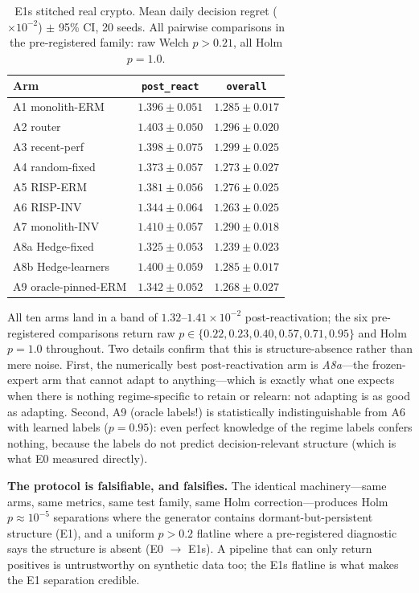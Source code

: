 \begin{table}[h]
\centering
\caption{E1s stitched real crypto. Mean daily decision regret
($\times 10^{-2}$) $\pm$ 95\% CI, 20 seeds. All pairwise comparisons in the
pre-registered family: raw Welch $p > 0.21$, all Holm $p = 1.0$.}
\label{tab:dd5-e1s}
\small
\begin{tabular}{lcc}
\toprule
Arm & \texttt{post\_react} & \texttt{overall} \\
\midrule
A1 monolith-ERM      & $1.396 \pm 0.051$ & $1.285 \pm 0.017$ \\
A2 router            & $1.403 \pm 0.050$ & $1.296 \pm 0.020$ \\
A3 recent-perf       & $1.398 \pm 0.075$ & $1.299 \pm 0.025$ \\
A4 random-fixed      & $1.373 \pm 0.057$ & $1.273 \pm 0.027$ \\
A5 RISP-ERM      & $1.381 \pm 0.056$ & $1.276 \pm 0.025$ \\
A6 RISP-INV      & $1.344 \pm 0.064$ & $1.263 \pm 0.025$ \\
A7 monolith-INV      & $1.410 \pm 0.057$ & $1.290 \pm 0.018$ \\
A8a Hedge-fixed      & $1.325 \pm 0.053$ & $1.239 \pm 0.023$ \\
A8b Hedge-learners   & $1.400 \pm 0.059$ & $1.285 \pm 0.017$ \\
A9 oracle-pinned-ERM & $1.342 \pm 0.052$ & $1.268 \pm 0.027$ \\
\bottomrule
\end{tabular}
\end{table}

All ten arms land in a band of $1.32$--$1.41 \times 10^{-2}$
post-reactivation; the six pre-registered comparisons return raw
$p \in \{0.22, 0.23, 0.40, 0.57, 0.71, 0.95\}$ and Holm $p = 1.0$
throughout. Two details confirm that this is structure-absence rather than
mere noise. First, the numerically best post-reactivation arm is
\emph{A8a}---the frozen-expert arm that cannot adapt to anything---which is
exactly what one expects when there is nothing regime-specific to retain or
relearn: not adapting is as good as adapting. Second, A9 (oracle labels!)
is statistically indistinguishable from A6 with learned labels
($p = 0.95$): even perfect knowledge of the regime labels confers nothing,
because the labels do not predict decision-relevant structure (which is
what E0 measured directly).

\begin{keypoint}
\textbf{The protocol is falsifiable, and falsifies.} The identical
machinery---same arms, same metrics, same test family, same Holm
correction---produces Holm $p \approx 10^{-5}$ separations where the
generator contains dormant-but-persistent structure (E1), and a uniform
$p > 0.2$ flatline where a pre-registered diagnostic says the structure is
absent (E0 $\to$ E1s). A pipeline that can only return positives is
untrustworthy on synthetic data too; the E1s flatline is what makes the E1
separation credible.
\end{keypoint}

